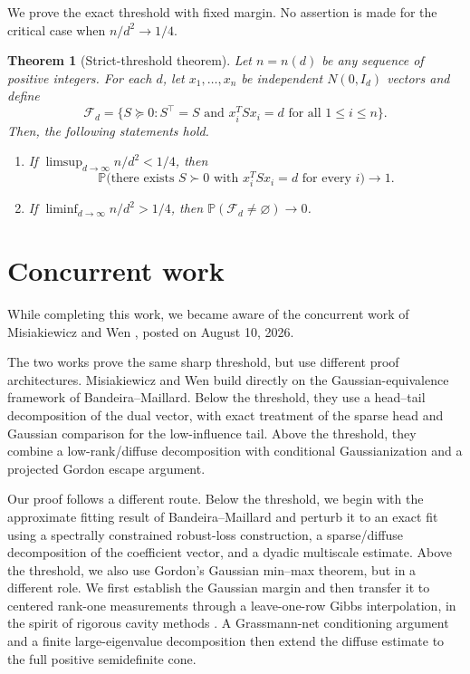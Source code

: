 \documentclass[11pt]{article}
\numberwithin{equation}{section}
\newtheorem{theorem}{Theorem}[section]
\theoremstyle{definition}
\theoremstyle{remark}
\newcommand{\Pp}{\mathbb P}
\newcommand{\1}{\boldsymbol 1}
\newcommand{\cF}{\mathcal F}
\begin{document}
\begin{humanblock}
We prove the exact threshold with fixed margin. No assertion is made for the critical case when $n/d^2\to1/4$.

\begin{theorem}[Strict-threshold theorem]\label{thm:main}
  Let $n=n(d)$ be any sequence of positive
  integers. For each $d$, let
  $x_1,\ldots,x_n$ be independent
  $N(0,I_d)$ vectors and define
  \[
    \cF_d=\{S\succeq0:S^\top = S \text{~and~}
    x_i^TSx_i=d\text{ for all }1\le i\le n\}.
  \]
  Then, the following statements hold.
  \begin{enumerate}[label=\textup{(\roman*)}]
    \item If $\limsup_{d\to\infty}n/d^2<1/4$,
    then
    \[
      \Pp\bigl(\text{there exists }S\succ0
      \text{ with }x_i^TSx_i=d \text{ for every }
      i\bigr)\longrightarrow1.
    \]
    \item If $\liminf_{d\to\infty}n/d^2>1/4$,
    then $\Pp(\cF_d\ne\varnothing)\to0$.
  \end{enumerate}
  
\end{theorem}
\end{humanblock}


\section*{Concurrent work}

\begin{humanblock}
While completing this work, we became aware of the concurrent work of Misiakiewicz and Wen \cite{MisiakiewiczWen2026}, posted on August 10, 2026. 

  
The two works prove the same sharp threshold, but use different proof architectures. Misiakiewicz and Wen build directly on the Gaussian-equivalence framework of Bandeira--Maillard. Below the threshold, they use a head--tail decomposition of the dual vector, with exact treatment of the sparse head and Gaussian comparison for the low-influence tail. Above the threshold, they combine a low-rank/diffuse decomposition with conditional Gaussianization and a projected Gordon escape argument.


Our proof follows a different route. Below the threshold, we begin with the approximate fitting result of Bandeira--Maillard and perturb it to an exact fit using a spectrally constrained robust-loss construction, a sparse/diffuse decomposition of the coefficient vector, and a dyadic multiscale estimate. Above the threshold, we also use Gordon's Gaussian min--max theorem, but in a different role. We first establish the Gaussian margin and then transfer it to centered
rank-one measurements through a leave-one-row Gibbs interpolation, in the spirit of rigorous cavity methods
\cite{AizenmanSimsStarr2003, Talagrand2011}. A Grassmann-net conditioning argument and a finite large-eigenvalue decomposition then extend the diffuse estimate to the full positive semidefinite cone.
 
\end{humanblock}
\end{document}
